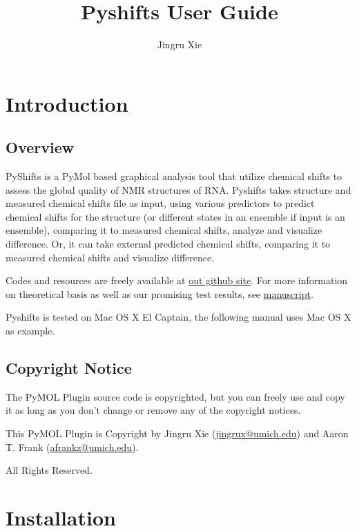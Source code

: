 \documentclass{article}
\begin{document}
\title{Pyshifts User Guide}
\author{Jingru Xie}
\maketitle


\tableofcontents


\newpage
\section{Introduction}
\subsection{Overview}

PyShifts is a PyMol based graphical analysis tool that utilize chemical shifts to assess the global quality of NMR structures of RNA. Pyshifts takes structure and measured chemical shifts file as input, using various predictors to predict chemical shifts for the structure (or different states in an ensemble if input is an ensemble), comparing it to measured chemical shifts, analyze and visualize difference. Or, it can take external predicted chemical shifts, comparing it to measured chemical shifts and visualize difference. 

Codes and resources are freely available at \href{https://github.com/atfrank/PyShifts}{out github site}. For more information on theoretical basis as well as our promising test results, see \href{http://linktoManuscript}{manuscript}. 

Pyshifts is tested on Mac OS X El Captain, the following manual uses Mac OS X as example. 

\subsection{Copyright Notice}

The PyMOL Plugin source code is copyrighted, but you can freely use and copy it as long as you don't change or remove any of the copyright notices.

This PyMOL Plugin is Copyright by Jingru Xie (\href{mailto:jingrux@umich.edu}{jingrux@umich.edu}) and Aaron T. Frank (\href{mailto:afrankz@umich.edu}{afrankz@umich.edu}).
                          
 All Rights Reserved.



\newpage
\section{Installation}
\end{document}
